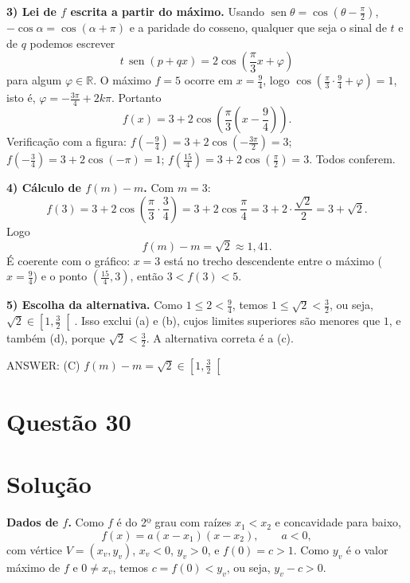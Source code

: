 \documentclass{article}%
\begin{document}
\textbf{3) Lei de $f$ escrita a partir do máximo.} Usando $\operatorname{sen}\theta=\cos\!\left(\theta-\tfrac{\pi}{2}\right)$, $-\cos\alpha=\cos(\alpha+\pi)$ e a paridade do cosseno, qualquer que seja o sinal de $t$ e de $q$ podemos escrever
\[
t\,\operatorname{sen}(p+qx) = 2\cos\!\left(\frac{\pi}{3}x+\varphi\right)
\]
para algum $\varphi\in\mathbb{R}$. O máximo $f=5$ ocorre em $x=\tfrac{9}{4}$, logo $\cos\!\left(\tfrac{\pi}{3}\cdot\tfrac{9}{4}+\varphi\right)=1$, isto é, $\varphi=-\tfrac{3\pi}{4}+2k\pi$. Portanto
\[
f(x) = 3 + 2\cos\!\left(\frac{\pi}{3}\left(x-\frac{9}{4}\right)\right).
\]
Verificação com a figura: $f\!\left(-\tfrac94\right)=3+2\cos\!\left(-\tfrac{3\pi}{2}\right)=3$; $f\!\left(-\tfrac34\right)=3+2\cos(-\pi)=1$; $f\!\left(\tfrac{15}{4}\right)=3+2\cos\!\left(\tfrac{\pi}{2}\right)=3$. Todos conferem.

\textbf{4) Cálculo de $f(m)-m$.} Com $m=3$:
\[
f(3) = 3 + 2\cos\!\left(\frac{\pi}{3}\cdot\frac{3}{4}\right) = 3 + 2\cos\frac{\pi}{4} = 3 + 2\cdot\frac{\sqrt{2}}{2} = 3+\sqrt{2}.
\]
Logo
\[
f(m) - m = \sqrt{2} \approx 1{,}41 .
\]
É coerente com o gráfico: $x=3$ está no trecho descendente entre o máximo ($x=\tfrac94$) e o ponto $\left(\tfrac{15}{4},3\right)$, então $3<f(3)<5$.

\textbf{5) Escolha da alternativa.} Como $1 \le 2 < \tfrac{9}{4}$, temos $1 \le \sqrt{2} < \tfrac{3}{2}$, ou seja, $\sqrt{2}\in\left[1,\tfrac{3}{2}\right[$. Isso exclui (a) e (b), cujos limites superiores são menores que $1$, e também (d), porque $\sqrt{2}<\tfrac32$. A alternativa correta é a (c).

ANSWER: (C) $f(m)-m=\sqrt{2}\in\left[1,\tfrac{3}{2}\right[$%
\newpage%
\section*{Questão 30}

\section*{Solução}

\textbf{Dados de $f$.} Como $f$ é do 2º grau com raízes $x_1<x_2$ e concavidade para baixo,
\[
f(x)=a(x-x_1)(x-x_2),\qquad a<0,
\]
com vértice $V=(x_v,y_v)$, $x_v<0$, $y_v>0$, e $f(0)=c>1$. Como $y_v$ é o valor máximo de $f$ e $0\neq x_v$, temos $c=f(0)<y_v$, ou seja, $y_v-c>0$.
\end{document}
